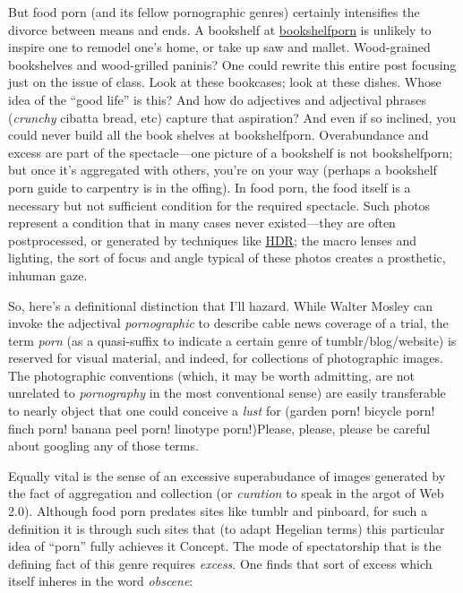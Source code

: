 \documentclass[
  12pt,
]{article}
\begin{document}
But food porn (and its fellow pornographic genres) certainly intensifies
the divorce between means and ends. A bookshelf at
\href{http://bookshelfporn.com/}{bookshelfporn} is unlikely to inspire
one to remodel one's home, or take up saw and mallet. {Wood-grained
bookshelves and wood-grilled paninis? One could rewrite this entire post
focusing just on the issue of class. Look at these bookcases; look at
these dishes. Whose idea of the ``good life'' is this? And how do
adjectives and adjectival phrases (\emph{crunchy} cibatta bread, etc)
capture that aspiration?} And even if so inclined, you could never build
all the book shelves at bookshelfporn. Overabundance and excess are part
of the spectacle---one picture of a bookshelf is not bookshelfporn; but
once it's aggregated with others, you're on your way (perhaps a
bookshelf porn guide to carpentry is in the offing). In food porn, the
food itself is a necessary but not sufficient condition for the required
spectacle. Such photos represent a condition that in many cases never
existed---they are often postprocessed, or generated by techniques like
\href{http://deviantmonk.com/hdr-food-photography-tutorial/}{HDR}; the
macro lenses and lighting, the sort of focus and angle typical of these
photos creates a prosthetic, inhuman gaze.

So, here's a definitional distinction that I'll hazard. While Walter
Mosley can invoke the adjectival \emph{pornographic} to describe cable
news coverage of a trial, the term \emph{porn} (as a quasi-suffix to
indicate a certain genre of tumblr/blog/website) is reserved for visual
material, and indeed, for collections of photographic images. The
photographic conventions (which, it may be worth admitting, are not
unrelated to \emph{pornography} in the most conventional sense) are
easily transferable to nearly object that one could conceive a
\emph{lust} for (garden porn! bicycle porn! finch porn! banana peel
porn! linotype porn!){Please, please, please be careful about googling
any of those terms.}

Equally vital is the sense of an excessive superabudance of images
generated by the fact of aggregation and collection (or \emph{curation}
to speak in the argot of Web 2.0). Although food porn predates sites
like tumblr and pinboard, for such a definition it is through such sites
that (to adapt Hegelian terms) this particular idea of ``porn'' fully
achieves it Concept. The mode of spectatorship that is the defining fact
of this genre requires \emph{excess}. One finds that sort of excess
which itself inheres in the word \emph{obscene}:
\end{document}
